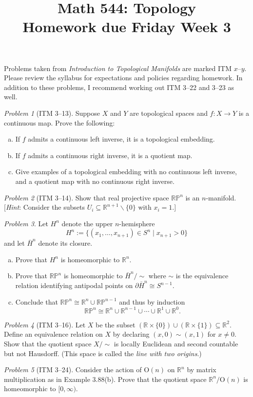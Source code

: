 \documentclass[11pt,twoside]{amsart}
\title{Math 544: Topology\\ Homework due Friday Week 3}
\theoremstyle{plain}
\theoremstyle{remark}
\newtheorem{prob}{Problem}
\theoremstyle{definition}
\theoremstyle{definition}
\newcommand{\RR}{\mathbb{R}}
\newcommand{\PP}{\mathbb{P}}
\begin{document}
\maketitle

\noindent Problems taken from \emph{Introduction to Topological Manifolds} are marked ITM $x$--$y$. Please review the syllabus for expectations and policies regarding homework. In addition to these problems, I recommend working out ITM 3--22 and 3--23 as well.

\begin{prob}[ITM 3--13]
Suppose $X$ and $Y$ are topological spaces and $f\colon X\to Y$ is a continuous map. Prove the following:
\begin{enumerate}[(a)]
  \item If $f$ admits a continuous left inverse, it is a topological embedding.
  \item If $f$ admits a continuous right inverse, it is a quotient map.
  \item Give examples of a topological embedding with no continuous left inverse, and a quotient map with no continuous right inverse.
\end{enumerate}
\end{prob}

\begin{prob}[ITM 3--14]
Show that real projective space $\RR\PP^n$ is an $n$-manifold. [\emph{Hint}: Consider the subsets $U_i\subseteq \RR^{n+1}\smallsetminus \{0\}$ with $x_i = 1$.]
\end{prob}

\begin{prob}
Let $H^n$ denote the upper $n$-hemisphere
\[
  H^n := \{(x_1,\ldots,x_{n+1})\in S^n\mid x_{n+1}>0\}
\]
and let $\bar H^n$ denote its closure.
\begin{enumerate}[(a)]
\item Prove that $H^n$ is homeomorphic to $\RR^n$.
\item Prove that $\RR\PP^n$ is homeomorphic to $\bar H^n/{\sim}$ where $\sim$ is the equivalence relation identifying antipodal points on $\partial \bar H^n\cong S^{n-1}$.
\item Conclude that $\RR\PP^n\cong \RR^n\cup \RR\PP^{n-1}$ and thus by induction
\[
  \RR\PP^n \cong \RR^n\cup \RR^{n-1}\cup \cdots\cup \RR^1\cup \RR^0.
\]
\end{enumerate}
\end{prob}

\begin{prob}[ITM 3--16]
Let $X$ be the subset $(\RR\times\{0\})\cup(\RR\times \{1\})\subseteq \RR^2$. Define an equivalence relation on $X$ by declaring $(x,0)\sim (x,1)$ for $x\ne 0$. Show that the quotient space $X/{\sim}$ is locally Euclidean and second countable but not Hausdorff. (This space is called the \emph{line with two origins}.)
\end{prob}

\begin{prob}[ITM 3--24]
Consider the action of $\mathrm{O}(n)$ on $\RR^n$ by matrix multiplication as in Example 3.88(b). Prove that the quotient space $\RR^n/\mathrm{O}(n)$ is homeomorphic to $[0,\infty)$.
\end{prob}
\end{document}

